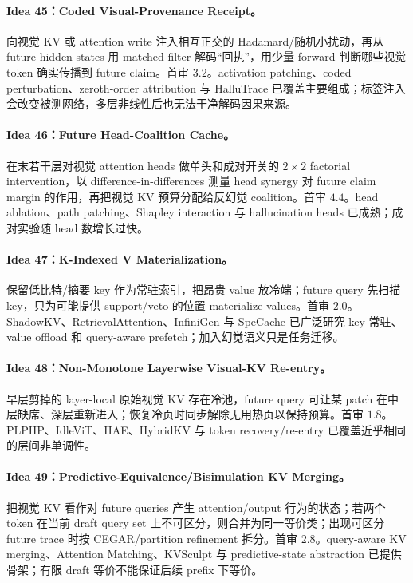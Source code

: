 \documentclass[UTF8,zihao=-4,a4paper]{ctexart}
\begin{document}
\paragraph{Idea 45：Coded Visual-Provenance Receipt。}
向视觉 KV 或 attention write 注入相互正交的 Hadamard/随机小扰动，再从 future hidden states 用 matched filter 解码“回执”，用少量 forward 判断哪些视觉 token 确实传播到 future claim。首审 $3.2$。activation patching、coded perturbation、zeroth-order attribution 与 HalluTrace 已覆盖主要组成；标签注入会改变被测网络，多层非线性后也无法干净解码因果来源。

\paragraph{Idea 46：Future Head-Coalition Cache。}
在末若干层对视觉 attention heads 做单头和成对开关的 $2\times2$ factorial intervention，以 difference-in-differences 测量 head synergy 对 future claim margin 的作用，再把视觉 KV 预算分配给反幻觉 coalition。首审 $4.4$。head ablation、path patching、Shapley interaction 与 hallucination heads 已成熟；成对实验随 head 数增长过快。

\paragraph{Idea 47：K-Indexed V Materialization。}
保留低比特/摘要 key 作为常驻索引，把昂贵 value 放冷端；future query 先扫描 key，只为可能提供 support/veto 的位置 materialize values。首审 $2.0$。ShadowKV、RetrievalAttention、InfiniGen 与 SpeCache 已广泛研究 key 常驻、value offload 和 query-aware prefetch；加入幻觉语义只是任务迁移。

\paragraph{Idea 48：Non-Monotone Layerwise Visual-KV Re-entry。}
早层剪掉的 layer-local 原始视觉 KV 存在冷池，future query 可让某 patch 在中层缺席、深层重新进入；恢复冷页时同步解除无用热页以保持预算。首审 $1.8$。PLPHP、IdleViT、HAE、HybridKV 与 token recovery/re-entry 已覆盖近乎相同的层间非单调性。

\paragraph{Idea 49：Predictive-Equivalence/Bisimulation KV Merging。}
把视觉 KV 看作对 future queries 产生 attention/output 行为的状态；若两个 token 在当前 draft query set 上不可区分，则合并为同一等价类；出现可区分 future trace 时按 CEGAR/partition refinement 拆分。首审 $2.8$。query-aware KV merging、Attention Matching、KVSculpt 与 predictive-state abstraction 已提供骨架；有限 draft 等价不能保证后续 prefix 下等价。
\end{document}
